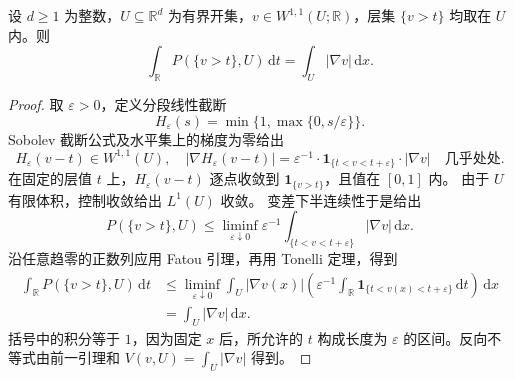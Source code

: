 \begin{lemma}[\(W^{1,1}\) 的层集周长公式]\label{b1:lem:w11-perimeter-coarea}
设 \(d\ge1\) 为整数，\(U\subseteq\mathbb R^d\) 为有界开集，\(v\in W^{1,1}(U;\mathbb R)\)，层集 \(\{v>t\}\) 均取在 \(U\) 内。则
\[
 \int_{\mathbb R}P(\{v>t\},U)\,\mathrm dt
       =\int_U|\nabla v|\,\mathrm dx.
\]
\end{lemma}
\begin{proof}
取 \(\varepsilon>0\)，定义分段线性截断
\[
 H_\varepsilon(s)=\min\bigl\{1,\max\{0,s/\varepsilon\}\bigr\}.
\]
Sobolev 截断公式及水平集上的梯度为零给出
\[
 H_\varepsilon(v-t)\in W^{1,1}(U),\quad
 \bigl|\nabla H_\varepsilon(v-t)\bigr|
   =\varepsilon^{-1}\cdot\mathbf1_{\{t<v<t+\varepsilon\}}\cdot|\nabla v|
       \quad\text{几乎处处}.
\]
在固定的层值 \(t\) 上，\(H_\varepsilon(v-t)\) 逐点收敛到
\(\mathbf1_{\{v>t\}}\)，且值在 \([0,1]\) 内。
由于 \(U\) 有限体积，控制收敛给出 \(L^1(U)\) 收敛。
变差下半连续性于是给出
\[
 P(\{v>t\},U)
 \le\liminf_{\varepsilon\downarrow0}
      \varepsilon^{-1}\int_{\{t<v<t+\varepsilon\}}|\nabla v|\,\mathrm dx.
\]
沿任意趋零的正数列应用 Fatou 引理，再用 Tonelli 定理，得到
\[
 \begin{aligned}
 \int_{\mathbb R}P(\{v>t\},U)\,\mathrm dt
 &\le\liminf_{\varepsilon\downarrow0}
   \int_U|\nabla v(x)|\left(
    \varepsilon^{-1}\int_{\mathbb R}
       \mathbf1_{\{t<v(x)<t+\varepsilon\}}\,\mathrm dt\right)\,\mathrm dx\\
 &=\int_U|\nabla v|\,\mathrm dx.
 \end{aligned}
\]
括号中的积分等于 \(1\)，因为固定 \(x\) 后，所允许的 \(t\) 构成长度为
\(\varepsilon\) 的区间。反向不等式由前一引理和
\(V(v,U)=\int_U|\nabla v|\) 得到。
\end{proof}

